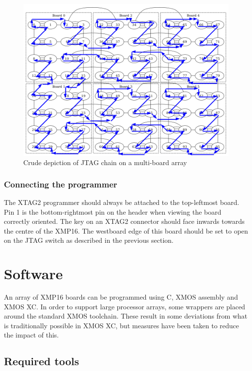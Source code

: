 \documentclass[12pt,a4paper,final,twoside]{article}
\begin{document}
\begin{figure}[htbp]
\centering
\includegraphics[scale=0.6]{jtag-3x2.png}
\caption{Crude depiction of JTAG chain on a multi-board array}
\end{figure}



\subsubsection{Connecting the programmer}

The XTAG2 programmer should always be attached to the top-leftmost board. Pin 1 is the bottom-rightmost pin on the header when viewing the board correctly oriented. The key on an XTAG2 connector should face inwards towards the centre of the XMP16. The westboard edge of this board should be set to open on the JTAG switch as described in the previous section.

\section{Software}

An array of XMP16 boards can be programmed using C, XMOS assembly and XMOS XC. In order to support large processor arrays, some wrappers are placed around the standard XMOS toolchain. These result in some deviations from what is traditionally possible in XMOS XC, but measures have been taken to reduce the impact of this.

\subsection{Required tools}
\end{document}
